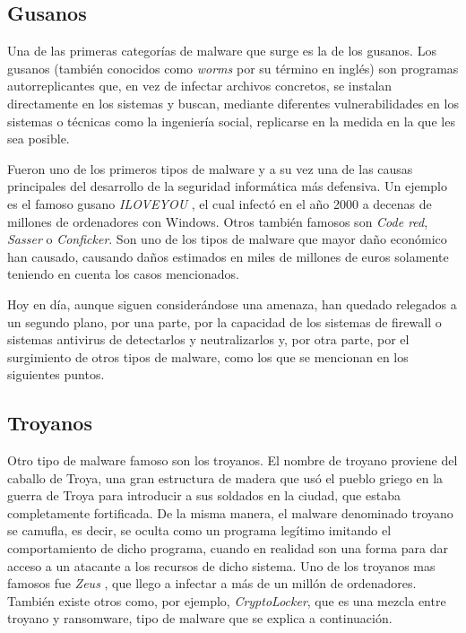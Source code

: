 \subsection{Gusanos}

Una de las primeras categorías de malware que surge es la de los gusanos. Los gusanos (también conocidos como \textit{worms} por su término en inglés) son programas autorreplicantes que, en vez de infectar archivos concretos, se instalan directamente en los sistemas y buscan, mediante diferentes vulnerabilidades en los sistemas o técnicas como la ingeniería social, replicarse en la medida en la que les sea posible.

Fueron uno de los primeros tipos de malware y a su vez una de las causas principales del desarrollo de la seguridad informática más defensiva. Un ejemplo es el famoso gusano \emph{ILOVEYOU} \cite{top-10-viruses}, el cual infectó en el año 2000 a decenas de millones de ordenadores con Windows. Otros también famosos son \emph{Code red}, \emph{Sasser} o \emph{Conficker}. Son uno de los tipos de malware que mayor daño económico han causado, causando daños estimados en miles de millones de euros solamente teniendo en cuenta los casos mencionados.

Hoy en día, aunque siguen considerándose una amenaza, han quedado relegados a un segundo plano, por una parte, por la capacidad de los sistemas de firewall o sistemas antivirus de detectarlos y neutralizarlos y, por otra parte, por el surgimiento de otros tipos de malware, como los que se mencionan en los siguientes puntos.

\subsection{Troyanos}

Otro tipo de malware famoso son los troyanos. El nombre de troyano proviene del caballo de Troya, una gran estructura de madera que usó el pueblo griego en la guerra de Troya para introducir a sus soldados en la ciudad, que estaba completamente fortificada. De la misma manera, el malware denominado troyano se camufla, es decir, se oculta como un programa legítimo imitando el comportamiento de dicho programa, cuando en realidad son una forma para dar acceso a un atacante a los recursos de dicho sistema. Uno de los troyanos mas famosos fue \emph{Zeus} \cite{top-10-viruses}, que llego a infectar a más de un millón de ordenadores. También existe otros como, por ejemplo, \emph{CryptoLocker}, que es una mezcla entre troyano y ransomware, tipo de malware que se explica a continuación.

